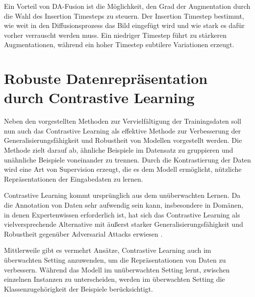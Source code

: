 Ein Vorteil von DA-Fusion ist die Möglichkeit, den Grad der Augmentation durch die Wahl des Insertion Timesteps zu steuern. Der Insertion Timestep bestimmt, wie weit in den Diffusionsprozess das Bild eingefügt wird und wie stark es dafür vorher verrauscht werden muss. Ein niedriger Timestep führt zu stärkeren Augmentationen, während ein hoher Timestep subtilere Variationen erzeugt.



\section{Robuste Datenrepräsentation durch Contrastive Learning} \label{sec-contrastive-learning}

Neben den vorgestellten Methoden zur Vervielfältigung der Trainingsdaten soll nun auch das Contrastive Learning als effektive Methode zur Verbesserung der Generalisierungsfähigkeit und Robustheit von Modellen vorgestellt werden. Die Methode zielt darauf ab, ähnliche Beispiele im Datensatz zu gruppieren und unähnliche Beispiele voneinander zu trennen. Durch die Kontrastierung der Daten wird eine Art von Supervision erzeugt, die es dem Modell ermöglicht, nützliche Repräsentationen der Eingabedaten zu lernen.

Contrastive Learning kommt ursprünglich aus dem unüberwachten Lernen. Da die Annotation von Daten sehr aufwendig sein kann, insbesondere in Domänen, in denen Expertenwissen erforderlich ist, hat sich das Contrastive Learning als vielversprechende Alternative mit äußerst starker Generalisierungsfähigkeit und Robustheit gegenüber Adversarial Attacks erwiesen \parencite{Liu2021understandimprovecontrastivelearning}.

Mittlerweile gibt es vermehrt Ansätze, Contrastive Learning auch im überwachten Setting anzuwenden, um die Repräsentationen von Daten zu verbessern. Während das Modell im unüberwachten Setting lernt, zwischen einzelnen Instanzen zu unterscheiden, werden im überwachten Setting die Klassenzugehörigkeit der Beispiele berücksichtigt.

